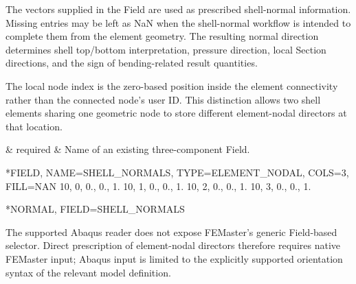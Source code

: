 The vectors supplied in the Field are used as prescribed shell-normal information. Missing entries may be left as NaN when the shell-normal workflow is intended to complete them from the element geometry. The resulting normal direction determines shell top/bottom interpretation, pressure direction, local Section directions, and the sign of bending-related result quantities.

The local node index is the zero-based position inside the element connectivity rather than the connected node's user ID. This distinction allows two shell elements sharing one geometric node to store different element-nodal directors at that location.

\begin{keywordparameters}
 & required & Name of an existing three-component  Field. \\
\end{keywordparameters}

\exampleheading

\begin{dialectexamples}
\begin{femasterdeck}
*FIELD, NAME=SHELL_NORMALS,
 TYPE=ELEMENT_NODAL, COLS=3, FILL=NAN
10, 0, 0., 0., 1.
10, 1, 0., 0., 1.
10, 2, 0., 0., 1.
10, 3, 0., 0., 1.

*NORMAL, FIELD=SHELL_NORMALS
\end{femasterdeck}
\begin{noabaqus}
The supported Abaqus reader does not expose FEMaster's generic Field-based  selector. Direct prescription of element-nodal directors therefore requires native FEMaster input; Abaqus input is limited to the explicitly supported orientation syntax of the relevant model definition.
\end{noabaqus}
\end{dialectexamples}
